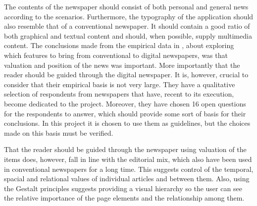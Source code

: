 The contents of the newspaper should consist of both personal and general news according to the scenarios. Furthermore, the typography of the application should also resemble that of a conventional newspaper. It should contain a good ratio of both graphical and textual content and should, when possible, supply multimedia content. The conclusions made from the empirical data in \cite{FULLTEXT01.pdf}, about exploring which features to bring from conventional to digital newspapers, was that valuation and position of the news was important. More importantly that the reader should be guided through the digital newspaper. It is, however, crucial to consider that their empirical basis is not very large. They have a qualitative selection of respondents from newspapers that have, recent to its execution, become dedicated to the project. Moreover, they have chosen 16 open questions for the respondents to answer, which should provide some sort of basis for their conclusions. In this project it is chosen to use them as guidelines, but the choices made on this basis must be verified.

That the reader should be guided through the newspaper using valuation of the items does, however, fall in line with the editorial mix, which also have been used in conventional newspapers for a long time. This suggests control of the temporal, spacial and relational values of individual articles and between them. Also, using the Gestalt principles \cite{Tidwell} suggests providing a visual hierarchy so the user can see the relative importance of the page elements and the relationship among them.

